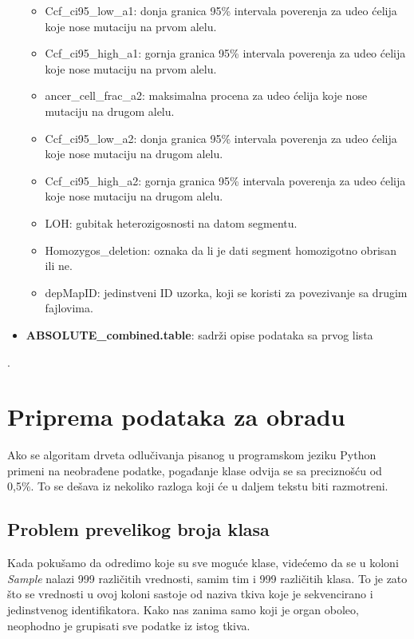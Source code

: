 \documentclass[a4paper]{article}
\begin{document}
\begin{itemize}
\begin{itemize}
        \item Ccf\_ci95\_low\_a1: donja granica 95\% intervala poverenja za udeo ćelija koje nose mutaciju na prvom alelu.
        \item Ccf\_ci95\_high\_a1: gornja granica 95\% intervala poverenja za udeo ćelija koje nose mutaciju na prvom alelu.
        \item ancer\_cell\_frac\_a2: maksimalna procena za udeo ćelija koje nose mutaciju na drugom alelu.
        \item Ccf\_ci95\_low\_a2: donja granica 95\% intervala poverenja za udeo ćelija koje nose mutaciju na drugom alelu.
        \item Ccf\_ci95\_high\_a2: gornja granica 95\% intervala poverenja za udeo ćelija koje nose mutaciju na drugom alelu.
        \item LOH: gubitak heterozigosnosti na datom segmentu.
        \item Homozygos\_deletion: oznaka da li je dati segment homozigotno obrisan ili ne.
        \item depMapID: jedinstveni ID uzorka, koji se koristi za povezivanje sa drugim fajlovima.
    \end{itemize}
    \item \textbf{ABSOLUTE\_combined.table}: sadrži opise podataka sa prvog lista
\end{itemize}.

\section{Priprema podataka za obradu}
\label{sec:preprocesiranje}

Ako se algoritam drveta odlučivanja pisanog u programskom jeziku Python primeni na neobrađene podatke, pogađanje klase odvija se sa preciznošću od 0,5\%. To se dešava iz nekoliko razloga koji će u daljem tekstu biti razmotreni.

\subsection{Problem prevelikog broja klasa}
\label{subsec:brojklasa}

Kada pokušamo da odredimo koje su sve moguće klase, videćemo da se u koloni \textit{Sample} nalazi 999 različitih vrednosti, samim tim i 999 različitih klasa. To je zato što se vrednosti u ovoj koloni sastoje od naziva tkiva koje je sekvencirano i jedinstvenog identifikatora. Kako nas zanima samo koji je organ oboleo, neophodno je grupisati sve podatke iz istog tkiva.
\end{document}
